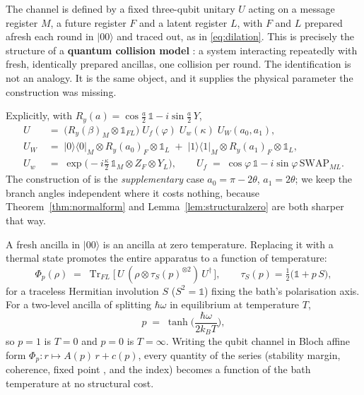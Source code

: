 \documentclass[11pt,a4paper]{article}
\theoremstyle{definition}
\theoremstyle{remark}
\DeclareMathOperator{\Tr}{Tr}
\newcommand{\I}{\mathbb{1}}
\providecommand{\ket}[1]{|#1\rangle}
\begin{document}
The channel is defined by a fixed three-qubit unitary $U$ acting on a message register $M$, a future register $F$ and a latent register $L$, with $F$ and $L$ prepared afresh each round in $\ket{00}$ and traced out, as in \eqref{eq:dilation}. This is precisely the structure of a \textbf{quantum collision model} \cite{Ciccarello2022}: a system interacting repeatedly with fresh, identically prepared ancillas, one collision per round. The identification is not an analogy. It is the same object, and it supplies the physical parameter the construction was missing.

Explicitly, with $R_y(a) = \cos\tfrac a2\,\I - i\sin\tfrac a2\,Y$,
\begin{align}
  U &\;=\; \big(R_y(\beta)_M\otimes\I_{FL}\big)\;U_f(\varphi)\;U_w(\kappa)\;U_W(a_0,a_1), \label{eq:U}\\
  U_W &\;=\; |0\rangle\!\langle0|_M\otimes R_y(a_0)_F\otimes\I_L \;+\; |1\rangle\!\langle1|_M\otimes R_y(a_1)_F\otimes\I_L, \nonumber\\
  U_w &\;=\; \exp\!\big(-i\tfrac{\kappa}{2}\,\I_M\otimes Z_F\otimes Y_L\big), \qquad
  U_f \;=\; \cos\varphi\,\I - i\sin\varphi\,\mathrm{SWAP}_{ML}. \nonumber
\end{align}
The construction of \cite{PaperI} is the \emph{supplementary} case $a_0 = \pi-2\theta$, $a_1 = 2\theta$; we keep the branch angles independent where it costs nothing, because Theorem~\ref{thm:normalform} and Lemma~\ref{lem:structuralzero} are both sharper that way.

A fresh ancilla in $|00\rangle$ is an ancilla at zero temperature. Replacing it with a thermal state promotes the entire apparatus to a function of temperature:
\begin{equation}\label{eq:thermalloop}
  \Phi_p(\rho) \;=\; \Tr_{FL}\big[\,U\,(\rho \otimes \tau_S(p)^{\otimes 2})\,U^{\dagger}\,\big],
  \qquad \tau_S(p) = \tfrac12\big(\I + p\,S\big),
\end{equation}
for a traceless Hermitian involution $S$ ($S^2 = \I$) fixing the bath's polarisation axis. For a two-level ancilla of splitting $\hbar\omega$ in equilibrium at temperature $T$,
\begin{equation}\label{eq:p}
  p \;=\; \tanh\!\Big(\frac{\hbar\omega}{2k_BT}\Big),
\end{equation}
so $p=1$ is $T=0$ and $p=0$ is $T=\infty$. Writing the qubit channel in Bloch affine form $\Phi_p : r \mapsto A(p)\,r + c(p)$, every quantity of the series (stability margin, coherence, fixed point \cite{PaperI}, and the index) becomes a function of the bath temperature at no structural cost.
\end{document}
